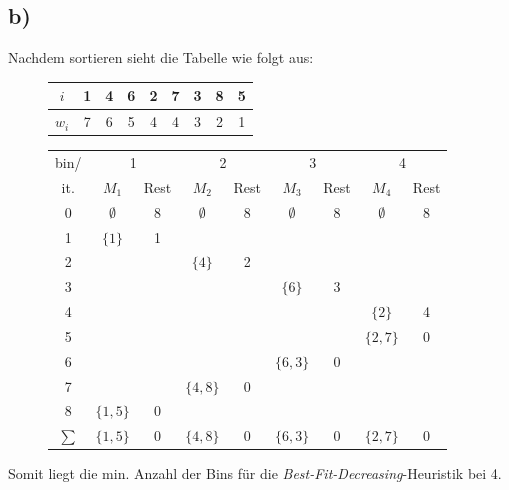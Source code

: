 \documentclass[12pt]{article}
\begin{document}
	\subsection{b)}
	Nachdem sortieren sieht die Tabelle wie folgt aus:
	\begin{figure}[H]
		\centering
		\begin{tabular}{c | c c c c c c c c}
			$i$   & 1 & 4 & 6 & 2 & 7 & 3 & 8 & 5 \\ \hline
			$w_i$ & 7 & 6 & 5 & 4 & 4 & 3 & 2 & 1 \\
		\end{tabular}
	
	
		\begin{tabular}{c || c  c | c  c | c c | c c }
			bin/ &  \multicolumn{2}{c|}{1} & \multicolumn{2}{c|}{2} & \multicolumn{2}{c|}{3} & \multicolumn{2}{c|}{4} \\ 
			it. & $M_1$ & Rest & $M_2$ & Rest & $M_3$ & Rest & $M_4$ & Rest  \\ \hline\hline
			0 & $\emptyset$ & 8 &  $\emptyset$ & 8 &  $\emptyset$ & 8 &  $\emptyset$ & 8   \\
			1 & $\{1\}$ & 1	& $ $ & $ $ 		& $ $ & $ $ 		& $ $ & $ $\\
			2 & $ $ & $ $ 	& $\{4\}$ & 2 		& $ $ & $ $ 		& $ $ & $ $\\
			3 & $ $ & $ $ 	& $ $ & $ $			& $\{6\} $ & 3 		& $ $ & $ $\\
			4 & $ $ & $ $ 	& $ $ & $ $ 		& $ $ & $ $  		& $\{2\} $ & 4\\
			5 & $ $ & $ $	& $ $ & $ $ 		& $ $ & $ $ 		& $\{2,7\} $ & 0\\
			6 & $ $ & $ $ 	& $ $ & $ $ 		& $\{6,3\}$ & 0 		& $ $ & $ $\\
			7 & $ $ & $ $ 	& $\{4,8\} $ & 0 		& $ $ & $ $  		& $ $ & $ $\\
			8 & $\{1,5\} $ & 0 	& $ $ & $ $ 		& $ $ & $ $ 		& $ $ & $ $\\ \hline\hline
			$\sum$ & $\{1,5\}$ & 0 & $\{4,8\}$ & 0 & $\{6,3\}$ & 0 & $\{2,7\}$& 0 \\
		\end{tabular}
	\end{figure}
	Somit liegt die min. Anzahl der Bins für die \textit{Best-Fit-Decreasing}-Heuristik bei 4.
\end{document}
